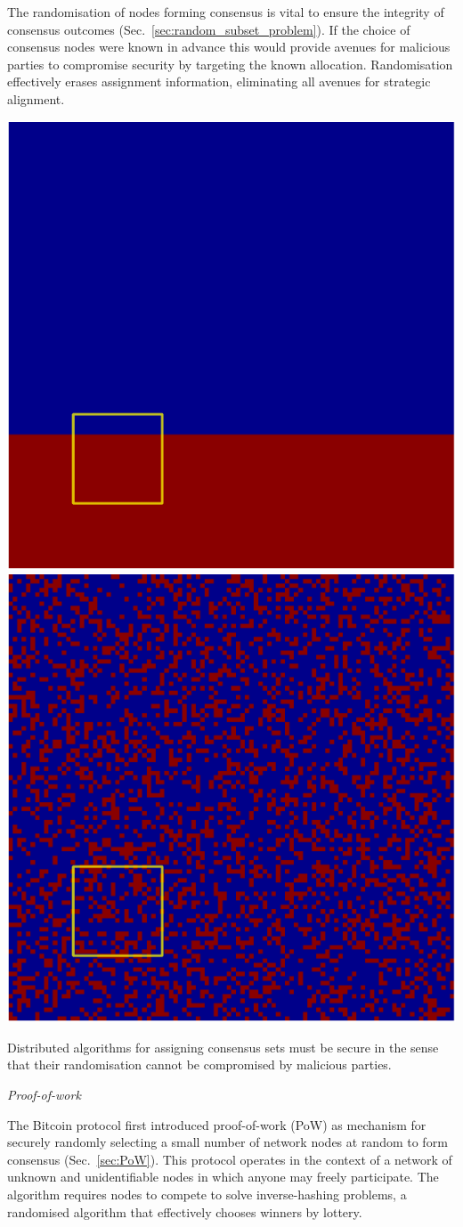 The randomisation of nodes forming consensus is vital to ensure the integrity of consensus outcomes (Sec.~\ref{sec:random_subset_problem}). If the choice of consensus nodes were known in advance this would provide avenues for malicious parties to compromise security by targeting the known allocation. Randomisation effectively erases assignment information, eliminating all avenues for strategic alignment.

\begin{center}
	\includegraphics[width=0.4\columnwidth]{figures/strategy_entropy_S_p03.pdf}
	\includegraphics[width=0.4\columnwidth]{figures/strategy_entropy_R_p03.pdf}
\end{center}

Distributed algorithms for assigning consensus sets must be secure in the sense that their randomisation cannot be compromised by malicious parties.

\begin{center}\emph{Proof-of-work}\end{center}

The Bitcoin protocol \cite{Nakamoto08} first introduced proof-of-work (PoW) as mechanism for securely randomly selecting a small number of network nodes at random to form consensus (Sec.~\ref{sec:PoW}). This protocol operates in the context of a network of unknown and unidentifiable nodes in which anyone may freely participate. The algorithm requires nodes to compete to solve inverse-hashing problems, a randomised algorithm that effectively chooses winners by lottery.

